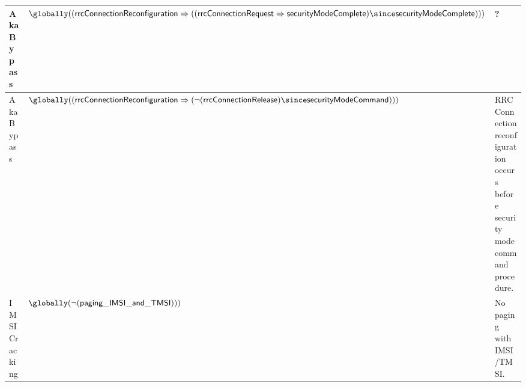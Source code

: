 \begin{table}[ht]
{\begin{tabular}{|l|l|l|}
        Aka Bypass            & $\globally((\mathsf{rrcConnectionReconfiguration}\Rightarrow((\mathsf{rrcConnectionRequest}\Rightarrow\mathsf{securityModeComplete})\since\mathsf{securityModeComplete})))$ & ?\\ \hline
        Aka Bypass            & $\globally((\mathsf{rrcConnectionReconfiguration}\Rightarrow(\neg(\mathsf{rrcConnectionRelease})\since\mathsf{securityModeCommand})))$ & RRC Connection reconfiguration occurs before security mode command procedure. \\ \hline
        IMSI Cracking         &  $\globally(\neg(\mathsf{paging\_IMSI\_and\_TMSI})))$ & No paging with IMSI/TMSI. \\ \hline
    \end{tabular}        
    }
\end{table}

